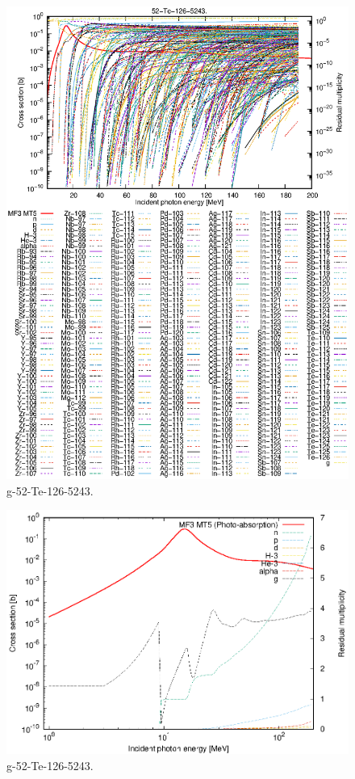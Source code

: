 \begin{figure}
 \includegraphics[width=\linewidth]{eps/g_52-Te-126_5243.eps}
  \caption{g-52-Te-126-5243.}
\end{figure}
\newpage \clearpage

\begin{figure}
 \includegraphics[width=\linewidth]{eps-log/g_52-Te-126_5243.eps}
 \caption{g-52-Te-126-5243.}
\end{figure}
\newpage \clearpage

